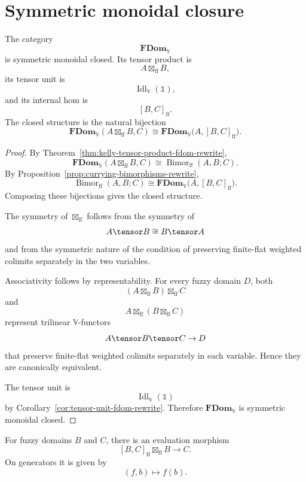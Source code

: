 \section{Symmetric monoidal closure}
\label{sec:smc-fdom-rewrite}

\begin{theorem}
\label{thm:fdom-smc-rewrite}
The category
\[
    \mathbf{FDom}_{\mathbb V}
\]
is symmetric monoidal closed.  Its tensor product is
\[
    A\boxtimes_{\mathrm{ff}}B,
\]
its tensor unit is
\[
    \operatorname{Idl}_{\mathbb V}(\mathbb 1),
\]
and its internal hom is
\[
    [B,C]_{\mathrm{ff}}.
\]
The closed structure is the natural bijection
\[
    \mathbf{FDom}_{\mathbb V}
    (A\boxtimes_{\mathrm{ff}}B,C)
    \cong
    \mathbf{FDom}_{\mathbb V}
    \bigl(A,[B,C]_{\mathrm{ff}}\bigr).
\]
\end{theorem}

\begin{proof}
By Theorem~\ref{thm:kelly-tensor-product-fdom-rewrite},
\[
    \mathbf{FDom}_{\mathbb V}
    (A\boxtimes_{\mathrm{ff}}B,C)
    \cong
    \operatorname{Bimor}_{\mathrm{ff}}(A,B;C).
\]
By Proposition~\ref{prop:currying-bimorphisms-rewrite},
\[
    \operatorname{Bimor}_{\mathrm{ff}}(A,B;C)
    \cong
    \mathbf{FDom}_{\mathbb V}
    \bigl(A,[B,C]_{\mathrm{ff}}\bigr).
\]
Composing these bijections gives the closed structure.

The symmetry of \(\boxtimes_{\mathrm{ff}}\) follows from the symmetry of
\[
    A\tensor B\cong B\tensor A
\]
and from the symmetric nature of the condition of preserving finite-flat
weighted colimits separately in the two variables.

Associativity follows by representability.  For every fuzzy domain \(D\), both
\[
    (A\boxtimes_{\mathrm{ff}}B)\boxtimes_{\mathrm{ff}}C
\]
and
\[
    A\boxtimes_{\mathrm{ff}}(B\boxtimes_{\mathrm{ff}}C)
\]
represent trilinear \(\mathbb V\)-functors
\[
    A\tensor B\tensor C\to D
\]
that preserve finite-flat weighted colimits separately in each variable.  Hence
they are canonically equivalent.

The tensor unit is
\[
    \operatorname{Idl}_{\mathbb V}(\mathbb 1)
\]
by Corollary~\ref{cor:tensor-unit-fdom-rewrite}.  Therefore
\(\mathbf{FDom}_{\mathbb V}\) is symmetric monoidal closed.
\end{proof}

\begin{corollary}[Evaluation]
\label{cor:evaluation-fdom-rewrite}
For fuzzy domains \(B\) and \(C\), there is an evaluation morphism
\[
    [B,C]_{\mathrm{ff}}
    \boxtimes_{\mathrm{ff}}
    B
    \longrightarrow
    C.
\]
On generators it is given by
\[
    (f,b)\longmapsto f(b).
\]
\end{corollary}

